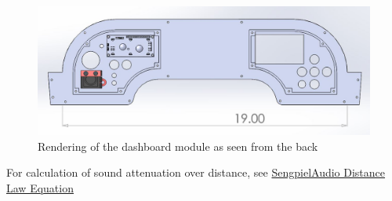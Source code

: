 \documentclass{article}
\begin{document}
\begin{figure}[H]
	\includegraphics[width=\linewidth]{Dashboard_Rendering_Rear}
	\caption{Rendering of the dashboard module as seen from the back} \label{fig:Dashboard Render}
\end{figure}

For calculation of sound attenuation over distance, see \href{http://www.sengpielaudio.com/calculator-distance.htm}{SengpielAudio Distance Law Equation}
\end{document}
